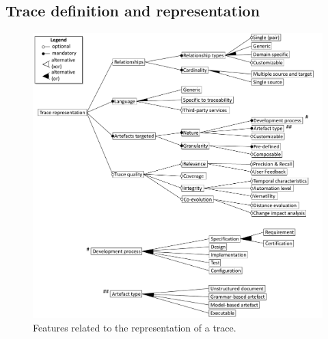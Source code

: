 \subsection{Trace definition and representation}
\label{sec:fm:def}
\begin{figure}[h]
	\centering
	\includegraphics[width=.8\linewidth]{images/fm-definition}
	\caption{Features related to the representation of a trace.}
	\label{fig:fm:definition}
\end{figure}


